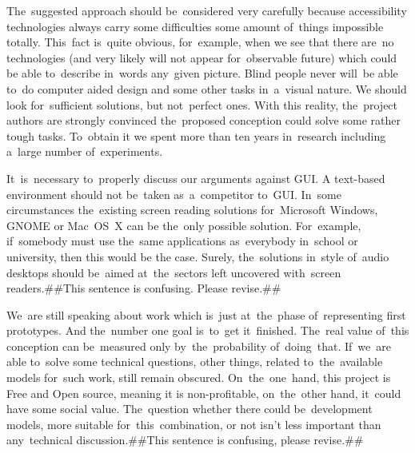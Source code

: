 \documentclass{acm_proc_article-sp}
\begin{document}
The~suggested approach should be~considered very carefully because  accessibility technologies 
always carry some difficulties some amount of~things impossible totally.
This~fact is~quite obvious, 
for~example, when we see that there are~no technologies (and very likely will not appear  for~observable future)
which could be able to~describe in~words any~given picture.
Blind people never will~be able to~do computer aided design and some other tasks in~a~visual nature.
We should look for~sufficient solutions, but not~perfect ones.
With this reality, the~project authors are strongly convinced the~proposed conception could solve some rather tough tasks.
To~obtain it we spent more than ten years in~research including a~large number of~experiments.

It~is~necessary to~properly discuss our arguments against GUI.
A text-based environment should not be~taken as~a~competitor to~GUI.
In~some circumstances the~existing  screen reading solutions for~Microsoft Windows, GNOME or Mac~OS~X
can be the~only possible solution.
For~example, if~somebody must use the~same applications as~everybody in~school or university,
then this would be the case.
Surely, the~solutions in~style of~audio desktops 
should be~aimed at~the~sectors left uncovered with~screen readers.##This sentence is confusing. Please revise.##

We~are still speaking about work which is~just at~the~phase of~representing first prototypes.
And the~number one goal is~to~get it~finished.
The~real value of~this conception can be~measured only by~the~probability of~doing~that.
If~we~are able to~solve some technical questions, 
other things, related to~the~available models for~such work, still remain obscured.
On~the~one~hand, this project is Free and Open source, meaning it is non-profitable,
on~the~other hand, it~could have some social value. 
The~question whether there could be~development models,  more suitable for~this~combination,  or not 
isn't less important than any~technical discussion.##This sentence is confusing, please revise.##

\end{document}
